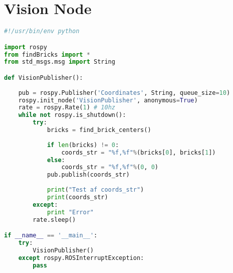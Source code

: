 \section{Vision Node}\label{sec:VisionNode}
\begin{lstlisting}[language=Python]
#!/usr/bin/env python

import rospy
from findBricks import *
from std_msgs.msg import String

def VisionPublisher():
    
    pub = rospy.Publisher('Coordinates', String, queue_size=10)
    rospy.init_node('VisionPublisher', anonymous=True)
    rate = rospy.Rate(1) # 10hz
    while not rospy.is_shutdown():
        try:
            bricks = find_brick_centers()
            
            if len(bricks) != 0:        
                coords_str = "%f,%f"%(bricks[0], bricks[1])
            else:
                coords_str = "%f,%f"%(0, 0)          
            pub.publish(coords_str)
            
            print("Test af coords_str")
            print(coords_str)
        except:
            print "Error"
        rate.sleep()

if __name__ == '__main__':
    try:
        VisionPublisher()
    except rospy.ROSInterruptException:
        pass
\end{lstlisting}
